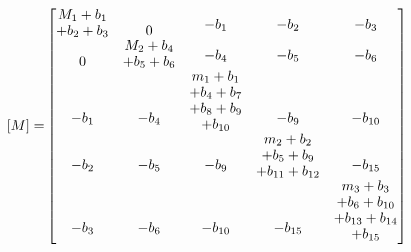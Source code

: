 \begin{equation}\label{Eq.mass_matrix_dimensional_combined}
\begin{aligned}
[M] =& 
\begin{bmatrix}
\shortstack[c]{$M_1 + b_1$ \\ $+ b_2 + b_3$} & 0 & \shortstack[c]{$-b_1$ \\ \,} & \shortstack[c]{$-b_2$ \\ \,} & \shortstack[c]{$-b_3$ \\ \,} \\
0 & \shortstack[c]{$M_2 + b_4$ \\ $+ b_5 + b_6$} & \shortstack[c]{$-b_4$ \\ \,} & \shortstack[c]{$-b_5$ \\ \,} & \shortstack[c]{$-b_6$ \\ \,} \\
\shortstack[c]{$-b_1$ \\ \,} & \shortstack[c]{$-b_4$ \\ \,} & \shortstack[c]{$m_1 + b_1$ \\ $+ b_4 + b_7$ \\ $+ b_8 + b_9$ \\ $+ b_{10}$} & \shortstack[c]{$-b_9$ \\ \,} & \shortstack[c]{$-b_{10}$ \\ \,} \\
\shortstack[c]{$-b_2$ \\ \,} & \shortstack[c]{$-b_5$ \\ \,} & \shortstack[c]{$-b_9$ \\ \,} & \shortstack[c]{$m_2 + b_2$ \\ $+ b_5 + b_9$ \\ $+ b_{11} + b_{12}$} & \shortstack[c]{$-b_{15}$ \\ \,} \\
\shortstack[c]{$-b_3$ \\ \,} & \shortstack[c]{$-b_6$ \\ \,} & \shortstack[c]{$-b_{10}$ \\ \,} & \shortstack[c]{$-b_{15}$ \\ \,} & \shortstack[c]{$m_3 + b_3$ \\ $+ b_6 + b_{10}$ \\ $+ b_{13} + b_{14}$ \\ $+ b_{15}$}
\end{bmatrix}
\end{aligned}
\end{equation}

